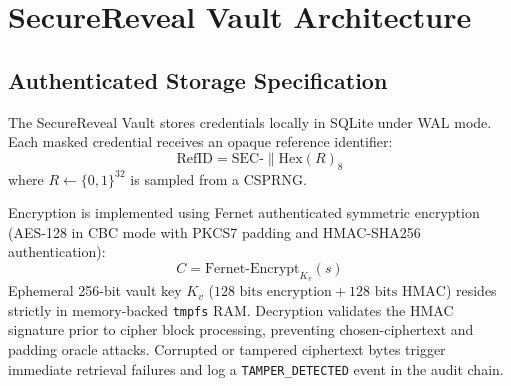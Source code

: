 \documentclass[conference]{IEEEtran}
\begin{document}
\section{SecureReveal Vault Architecture}

\subsection{Authenticated Storage Specification}
The SecureReveal Vault stores credentials locally in SQLite under WAL mode. Each masked credential receives an opaque reference identifier:
\begin{equation}
    \text{RefID} = \text{SEC-} \parallel \text{Hex}(R)_{8}
\end{equation}
where $R \leftarrow \{0,1\}^{32}$ is sampled from a CSPRNG.

Encryption is implemented using Fernet authenticated symmetric encryption (AES-128 in CBC mode with PKCS7 padding and HMAC-SHA256 authentication):
\begin{equation}
    C = \text{Fernet-Encrypt}_{K_v}(s)
\end{equation}
Ephemeral 256-bit vault key $K_v$ ($128\text{ bits encryption} + 128\text{ bits HMAC}$) resides strictly in memory-backed \texttt{tmpfs} RAM. Decryption validates the HMAC signature prior to cipher block processing, preventing chosen-ciphertext and padding oracle attacks. Corrupted or tampered ciphertext bytes trigger immediate retrieval failures and log a \texttt{TAMPER\_DETECTED} event in the audit chain.
\end{document}
